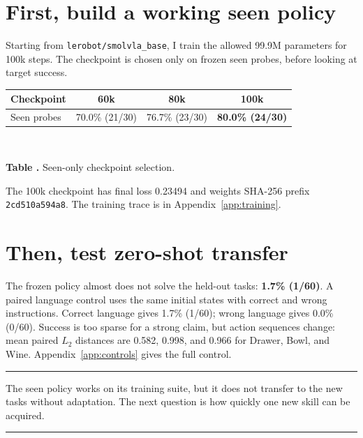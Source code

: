 \documentclass[10pt]{extarticle}
\newcommand{\score}[3]{#1\% (#2/#3)}
\newcommand{\tabcap}[2]{\refstepcounter{table}\label{#2}{\footnotesize\textbf{Table \thetable.} #1\par}}
\newenvironment{finding}{\begin{center}\begin{minipage}{0.94\textwidth}\small\hrule\vspace{3pt}}{\vspace{3pt}\hrule\end{minipage}\end{center}}
\begin{document}
\section{First, build a working seen policy}
Starting from \texttt{lerobot/smolvla\_base}, I train the allowed 99.9M
parameters for 100k steps. The checkpoint is chosen only on frozen seen
probes, before looking at target success.
\begin{center}
\footnotesize
\begin{tabular}{@{}lccc@{}}
\toprule
Checkpoint & 60k & 80k & \textbf{100k}\\
\midrule
Seen probes & \score{70.0}{21}{30} & \score{76.7}{23}{30} & \textbf{\score{80.0}{24}{30}}\\
\bottomrule
\end{tabular}\\[-1pt]
\tabcap{Seen-only checkpoint selection.}{tab:seen-selection}
\end{center}
The 100k checkpoint has final loss 0.23494 and weights SHA-256 prefix
\texttt{2cd510a594a8}. The training trace is in Appendix~\ref{app:training}.

\section{Then, test zero-shot transfer}
The frozen policy almost does not solve the held-out tasks:
\textbf{\score{1.7}{1}{60}}. A paired language control uses the same initial
states with correct and wrong instructions. Correct language gives
\score{1.7}{1}{60}; wrong language gives \score{0.0}{0}{60}. Success is too
sparse for a strong claim, but action sequences change: mean paired \(L_2\)
distances are 0.582, 0.998, and 0.966 for Drawer, Bowl, and Wine.
Appendix~\ref{app:controls} gives the full control.
\begin{finding}
The seen policy works on its training suite, but it does not transfer to the
new tasks without adaptation. The next question is how quickly one new skill
can be acquired.
\end{finding}

\newpage
\end{document}
